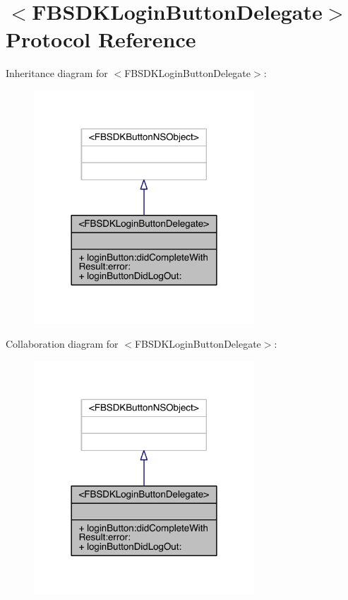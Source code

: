\hypertarget{protocol_f_b_s_d_k_login_button_delegate-p}{\section{$<$F\-B\-S\-D\-K\-Login\-Button\-Delegate$>$ Protocol Reference}
\label{protocol_f_b_s_d_k_login_button_delegate-p}
}


Inheritance diagram for $<$F\-B\-S\-D\-K\-Login\-Button\-Delegate$>$\-:
\nopagebreak
\begin{figure}[H]
\begin{center}
\leavevmode
\includegraphics[width=234pt]{protocol_f_b_s_d_k_login_button_delegate-p__inherit__graph}
\end{center}
\end{figure}


Collaboration diagram for $<$F\-B\-S\-D\-K\-Login\-Button\-Delegate$>$\-:
\nopagebreak
\begin{figure}[H]
\begin{center}
\leavevmode
\includegraphics[width=234pt]{protocol_f_b_s_d_k_login_button_delegate-p__coll__graph}
\end{center}
\end{figure}
